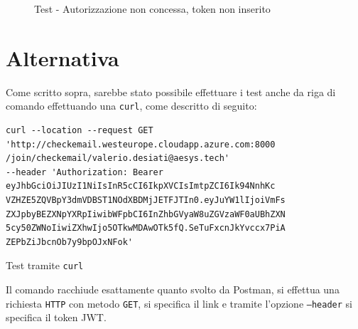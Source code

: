 \begin{figure}[h]
	\centering
	\caption{Test - Autorizzazione non concessa, token non inserito}
	\label{fig:noauth}
\end{figure}

\newpage
\section{Alternativa}\label{sec:testalternativa}
Come scritto sopra, sarebbe stato possibile effettuare i test anche da riga di comando effettuando una \texttt{curl}, come descritto di seguito:
\begin{algorithm}
\centering
\begin{verbatim}
curl --location --request GET 
'http://checkemail.westeurope.cloudapp.azure.com:8000
/join/checkemail/valerio.desiati@aesys.tech'
--header 'Authorization: Bearer 
eyJhbGciOiJIUzI1NiIsInR5cCI6IkpXVCIsImtpZCI6Ik94NnhKc
VZHZE5ZQVBpY3dmVDBST1NOdXBDMjJETFJTIn0.eyJuYW1lIjoiVmFs
ZXJpbyBEZXNpYXRpIiwibWFpbCI6InZhbGVyaW8uZGVzaWF0aUBhZXN
5cy50ZWNoIiwiZXhwIjo5OTkwMDAwOTk5fQ.SeTuFxcnJkYvccx7PiA
ZEPbZiJbcnOb7y9bpOJxNFok'
\end{verbatim}
\caption{Test tramite \texttt{curl}}\label{alg:container_config}
\end{algorithm}

Il comando racchiude esattamente quanto svolto da Postman, si effettua una richiesta \texttt{HTTP} con metodo \texttt{GET}, 
si specifica il link e tramite l’opzione \texttt{--header} si specifica il token JWT.